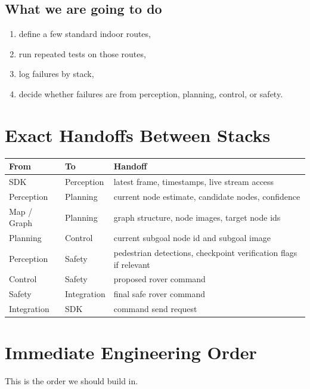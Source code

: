 \documentclass[11pt,a4paper]{article}
\begin{document}
\subsection{What we are going to do}

\begin{enumerate}[nosep]
  \item define a few standard indoor routes,
  \item run repeated tests on those routes,
  \item log failures by stack,
  \item decide whether failures are from perception, planning, control, or safety.
\end{enumerate}


\section{Exact Handoffs Between Stacks}

\begin{longtable}{p{} p{} p{}}
\toprule
\textbf{From} & \textbf{To} & \textbf{Handoff} \\
\midrule
SDK & Perception & latest frame, timestamps, live stream access \\
Perception & Planning & current node estimate, candidate nodes, confidence \\
Map / Graph & Planning & graph structure, node images, target node ids \\
Planning & Control & current subgoal node id and subgoal image \\
Perception & Safety & pedestrian detections, checkpoint verification flags if relevant \\
Control & Safety & proposed rover command \\
Safety & Integration & final safe rover command \\
Integration & SDK & command send request \\
\bottomrule
\end{longtable}


\section{Immediate Engineering Order}

This is the order we should build in.
\end{document}
